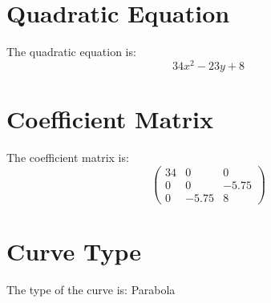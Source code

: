\documentclass{article}
\begin{document}
\section*{Quadratic Equation}
The quadratic equation is: 
\[ 34x^2-23y+8 \]
\section*{Coefficient Matrix}
The coefficient matrix is: 
\[
\begin{pmatrix}
34 & 0 & 0 \\
0 & 0 & -5.75 \\
0 & -5.75 & 8
\end{pmatrix}
\]
\section*{Curve Type}
The type of the curve is: Parabola
\end{document}
